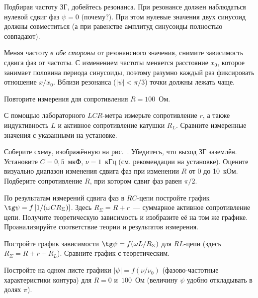 \begin{lab:task}
\item Подбирая частоту ЗГ, добейтесь резонанса. 
При резонансе должен наблюдаться нулевой сдвиг фаз $\psi=0$ (почему?).
При этом нулевые значения двух 
синусоид должны совместиться (а при равенстве амплитуд синусоиды 
полностью совпадают).
 
\item Меняя частоту \emph{в обе стороны} от резонансного значения, 
снимите зависимость сдвига фаз от частоты. С изменением частоты меняется 
расстояние $x_0$, которое занимает половина периода синусоиды, поэтому 
разумно каждый раз фиксировать отношение $x/x_0$. 
Вблизи резонанса ($|\psi|<\pi/3$) точки должны лежать чаще.
 
\item Повторите измерения для сопротивления $R=100$~Ом.
 
\item С помощью лабораторного $LCR$-метра измерьте сопротивление $r$,
а также индуктивность $L$ и активное сопротивление катушки $R_L$. 
Сравните измеренные значения с указанными на установке.



\item Соберите схему, изображённую на рис.~. Убедитесь, что 
выход ЗГ заземлён. Установите $C=0,5$~мкФ,  $\nu=1$~кГц
(см. рекомендации на установке). Оцените визуально диапазон изменения 
сдвига фаз при изменении $R$ от 0 до 10~кОм.
Подберите сопротивление $R$, при котором сдвиг фаз равен $\pi/2$.



\item По результатам измерений сдвига фаз в $RC$-цепи постройте график
$\tg\psi=f\left[1/(\omega C R_{\Sigma})\right]$. Здесь $R_{\Sigma}=R+r$~--- 
суммарное активное сопротивление цепи. Получите теоретическую 
зависимость и изобразите её на том же графике. Проанализируйте
соответствие теории и результатов измерения.

\item Постройте график зависимости $\tg\psi=f(\omega L/R_{\Sigma})$ 
для $RL$-цепи (здесь $R_{\Sigma}=R+r+R_L$). Сравните график с теоретическим.

\item Постройте на одном листе графики $|\psi|=f(\nu/\nu_0)$ 
(фазово-частотные характеристики контура) для $R=0$ и~$100$~Ом (величину $\psi$ удобно откладывать в долях $\pi$).


\end{lab:task}
